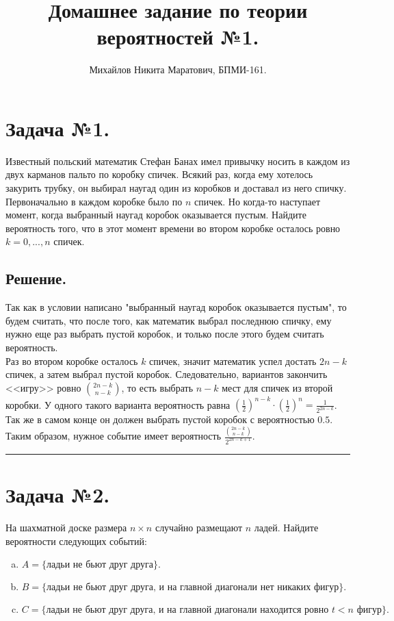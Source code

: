 \documentclass[a4paper, 12pt]{article}
\title{
	Домашнее задание по теории вероятностей №1.
}
\author{Михайлов Никита Маратович, БПМИ-161.
}
\date{}
\newcommand{\D}{\displaystyle}
\begin{document}
\maketitle
\begin{spacing}{1}
		
\section{Задача №1.} 
Известный польский математик Стефан Банах имел привычку носить в каждом из двух карманов пальто по коробку спичек. Всякий раз, когда ему хотелось закурить трубку, он выбирал наугад один из коробков и доставал из него спичку. Первоначально в каждом коробке было по $n$ спичек. Но когда-то наступает момент, когда выбранный наугад коробок оказывается пустым. Найдите вероятность того, что в этот момент времени во втором коробке осталось ровно $k = 0, . . . , n$ спичек.


\subsection{Решение.} Так как в условии написано "выбранный наугад коробок оказывается пустым", то будем считать, что после того, как математик выбрал последнюю спичку, ему нужно еще раз выбрать пустой коробок, и только после этого будем считать вероятность.\\
Раз во втором коробке осталось $k$ спичек, значит математик успел достать $2n - k$ спичек, а затем выбрал пустой коробок. Следовательно, вариантов закончить <<игру>> ровно $\binom{2n - k}{n - k}$, то есть выбрать $n - k$ мест для спичек из второй коробки. У одного такого варианта вероятность равна $\D \left(\frac{1}{2}\right)^{n - k}\cdot\left(\frac{1}{2}\right)^{n} = \frac{1}{2^{2n-k}}$. Так же в самом конце он должен выбрать пустой коробок с вероятностью $0.5$. Таким образом, нужное событие имеет вероятность $\D \frac{\binom{2n - k}{n - k}}{2^{2n-k+1}}$.\\
\hrule
\section{Задача №2.}
На шахматной доске размера $n \times n$ случайно размещают $n$ ладей. Найдите вероятности следующих событий:
\begin{enumerate}[(a)]
	\item $A = \{\text{ладьи не бьют друг друга}\}.$
	\item $B = \{\text{ладьи не бьют друг друга, и на главной диагонали нет никаких фигур}\}.$
	\item $C = \{\text{ладьи не бьют друг друга, и на главной диагонали находится ровно } t < n \text{ фигур}\}.$
\end{enumerate}

\end{spacing}
\end{document}
